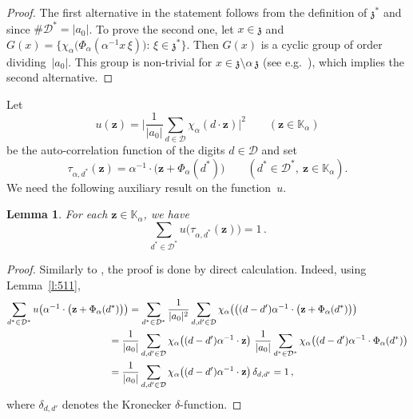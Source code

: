 \documentclass[12pt]{amsart}
\newtheorem{lemma}{Lemma}[section]
\theoremstyle{definition}
\theoremstyle{remark}
\numberwithin{equation}{section}
\begin{document}
\begin{proof}
The first alternative in the statement follows from the definition of $\mathfrak{z}^*$ and since $\#\mathcal{D}^* = |a_0|$.
To prove the second one, let $x \in \mathfrak{z}$ and $G(x) = \{\chi_\alpha\big(\Phi_\alpha(\alpha^{-1} x\, \xi)\big):\, \xi \in \mathfrak{z}^*\}$.
Then $G(x)$ is a cyclic group of order dividing~$|a_0|$.
This group is non-trivial for $x \in \mathfrak{z} \setminus \alpha\, \mathfrak{z}$ (see e.g.\ \cite[Corollary~23.26]{Hewitt-Ross:63}), which implies the second alternative.
\end{proof}

Let
\[
u(\mathbf{z}) = \bigg|\frac{1}{|a_0|} \sum_{d \in \mathcal{D}} \chi_\alpha(d \cdot \mathbf{z})\bigg|^2 \qquad (\mathbf{z} \in \mathbb{K}_\alpha)
\]
be the auto-correlation function of the digits $d\in \mathcal{D}$ and set
\[
\tau_{\alpha,d^*}(\mathbf{z}) = \alpha^{-1} \cdot \big(\mathbf{z} + \Phi_\alpha(d^*)\big) \qquad (d^* \in \mathcal{D}^*,\ \mathbf{z} \in \mathbb{K}_\alpha).
\]
We need the following auxiliary result on the function~$u$.

\begin{lemma} \label{l:512}
For each $\mathbf{z} \in \mathbb{K}_\alpha$, we have
\[
\sum_{d^*\in\mathcal{D}^*} u\big(\tau_{\alpha,d^*}(\mathbf{z})\big) = 1\,.
\]
\end{lemma}

\begin{proof}
Similarly to \cite[Lemma~5.1]{Groechenig-Haas:94}, the proof is done by direct calculation.
Indeed, using Lemma~\ref{l:511},
\begin{align*}
\sum_{d^*\in\mathcal{D}^*} u\big(\alpha^{-1} \cdot \big(\mathbf{z} + \Phi_\alpha(d^*)\big)\big) & = \sum_{d^*\in\mathcal{D}^*} \frac{1}{|a_0|^2} \sum_{d,d'\in\mathcal{D}} \chi_\alpha\big(\big((d-d') \alpha^{-1} \cdot \big(\mathbf{z} + \Phi_\alpha(d^*)\big)\big) \\
& \hspace{-2em} = \frac{1}{|a_0|} \sum_{d,d'\in\mathcal{D}} \chi_\alpha\big((d-d') \alpha^{-1} \cdot \mathbf{z}\big) \ \frac{1}{|a_0|} \sum_{d^*\in\mathcal{D}^*} \chi_\alpha\big((d-d') \alpha^{-1} \cdot \Phi_\alpha(d^*)\big) \\
& \hspace{-2em} = \frac{1}{|a_0|} \sum_{d,d'\in\mathcal{D}} \chi_\alpha\big((d-d') \alpha^{-1} \cdot \mathbf{z}\big)\, \delta_{d,d'} = 1\,,
\end{align*}
where $\delta_{d,d'}$ denotes the Kronecker $\delta$-function.
\end{proof}
\end{document}
